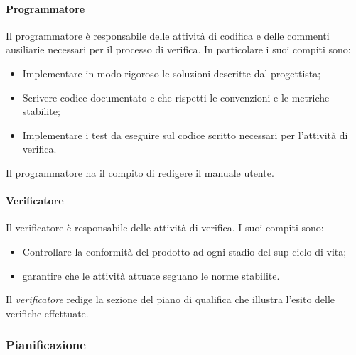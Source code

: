 		\paragraph{Programmatore}
		Il programmatore è responsabile delle attività di codifica e delle commenti ausiliarie necessari per il processo di verifica.
		In particolare i suoi compiti sono:
		\begin{itemize}
			\item Implementare in modo rigoroso le soluzioni descritte dal progettista;
			\item Scrivere codice documentato e che rispetti le convenzioni e le metriche stabilite;
			\item Implementare i test da eseguire sul codice scritto necessari per l'attività di verifica.
		\end{itemize}
		Il programmatore  ha il compito di redigere il manuale utente. 
		\paragraph{Verificatore}
		Il verificatore è responsabile delle attività di verifica.
		I suoi compiti sono:
		\begin{itemize}
			\item Controllare la conformità del prodotto ad ogni stadio del sup ciclo di vita;
			\item garantire che le attività attuate seguano le norme stabilite.
		\end{itemize}
		Il \textit{verificatore} redige la sezione del piano di qualifica che illustra l'esito delle verifiche effettuate.


\subsubsection{Pianificazione}
